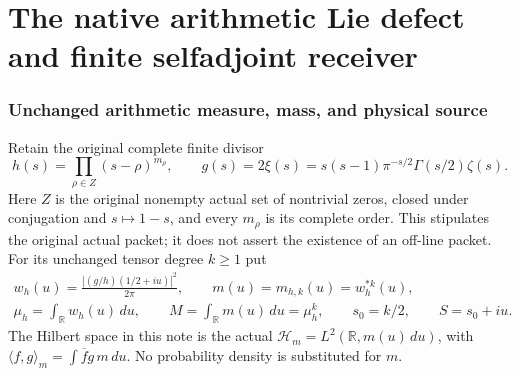 \documentclass[11pt]{article}
\begin{document}
\endgroup

\clearpage\begingroup
\part*{The native arithmetic Lie defect and finite selfadjoint receiver}
\newtheorem{swlietheorem}{Theorem}[section]
\newtheorem{swlieproposition}[swlietheorem]{Proposition}
\newtheorem{swlielemma}[swlietheorem]{Lemma}
\newtheorem{swliecorollary}[swlietheorem]{Corollary}
\newcommand{\swlieC}{\mathbb C}\newcommand{\swlieR}{\mathbb R}
\newcommand{\swliePP}{\mathcal P}\newcommand{\swlieHH}{\mathcal H}
\newcommand{\swlieB}{\mathscr B}\newcommand{\swlieM}{\mathcal M}
\newcommand{\swlienorm}[1]{\left\lVert#1\right\rVert}
\newcommand{\swlieac}[2]{\{#1,#2\}}


\section{Unchanged arithmetic measure, mass, and physical source}

Retain the original complete finite divisor
\[
 h(s)=\prod_{\rho\in Z}(s-\rho)^{m_\rho},\qquad
 g(s)=2\xi(s)=s(s-1)\pi^{-s/2}\Gamma(s/2)\zeta(s).
\]
Here $Z$ is the original nonempty actual set of nontrivial zeros,
closed under conjugation and $s\mapsto1-s$, and every $m_\rho$
is its complete order. This stipulates the original actual packet;
it does not assert the existence of an off-line packet. For its
unchanged tensor degree $k\geq1$ put
\begin{equation}\label{swlie:eq:measure}
 \begin{gathered}
 w_h(u)=\frac{|(g/h)(1/2+iu)|^2}{2\pi},\qquad
 m(u)=m_{h,k}(u)=w_h^{*k}(u),\\
 \mu_h=\int_\swlieR w_h(u)\,du,\qquad
 M=\int_\swlieR m(u)\,du=\mu_h^k,\qquad s_0=k/2,\qquad S=s_0+iu.
 \end{gathered}
\end{equation}
The Hilbert space in this note is the actual
$\swlieHH_m=L^2(\swlieR,m(u)\,du)$, with
$\langle f,g\rangle_m=\int\overline f g\,m\,du$.
No probability density is substituted for $m$.
\end{document}
